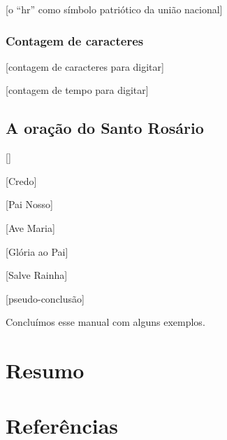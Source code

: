 \documentclass[12pt, a5paper, titlepage]{article}
\begin{document}
[o ``hr'' como símbolo patriótico da união nacional]

\subsubsection{Contagem de caracteres}\label{pt.section.count}
[contagem de caracteres para digitar]

[contagem de tempo para digitar]

\subsection{A oração do Santo Rosário}
[]

[Credo]

[Pai Nosso]

[Ave Maria]

[Glória ao Pai]

[Salve Rainha]

[pseudo-conclusão]


Concluímos esse manual com alguns exemplos.

\newpage
\section{Resumo}

\newpage
\section{Referências}
\end{document}
